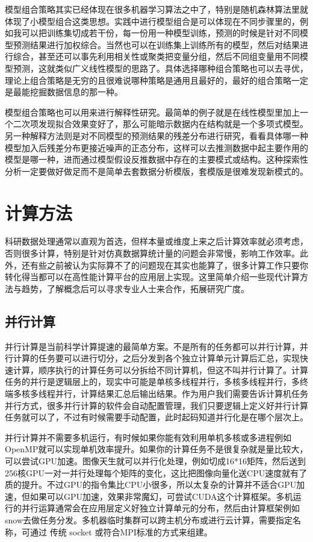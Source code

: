 \documentclass[]{tufte-book}
\begin{document}
模型组合策略其实已经体现在很多机器学习算法之中了，特别是随机森林算法里就体现了小模型组合这类思想。实践中进行模型组合是可以体现在不同步骤里的，例如我可以把训练集切成若干份，每一份用一种模型训练，预测的时候是针对不同模型预测结果进行加权综合。当然也可以在训练集上训练所有的模型，然后对结果进行综合，甚至还可以事先利用相关性或聚类把变量分组，然后不同组变量用不同模型预测，这就类似广义线性模型的思路了。具体选择哪种组合策略也可以去寻优，理论上组合策略是无穷的且很难说哪种策略是通用且最好的，最好的组合策略一定是最能挖掘数据信息的那一种。

模型组合策略也可以用来进行解释性研究。最简单的例子就是在线性模型里加上一个二次项发现拟合效果变好了，那么可能暗示数据内在结构就是一个多项式模型。另一种解释方法则是对不同模型的预测结果的残差分布进行研究，看看具体哪一种模型加入后残差分布更接近噪声的正态分布，这样可以去推测数据中起主要作用的模型是哪一种，进而通过模型假设反推数据中存在的主要模式或结构。这种探索性分析一定要做好做足而不是简单去套数据分析模版，套模版是很难发现新模式的。

\hypertarget{ux8ba1ux7b97ux65b9ux6cd5}{%
\section{计算方法}\label{ux8ba1ux7b97ux65b9ux6cd5}}

科研数据处理通常以直观为首选，但样本量或维度上来之后计算效率就必须考虑，否则很多计算，特别是针对仿真数据算统计量的问题会非常慢，影响工作效率。此外，还有些之前被认为实际算不了的问题现在其实也能算了，很多计算工作只要你转化得当都可以在高性能计算平台的应用层上实现。这里简单介绍一些现代计算方法与趋势，了解概念后可以寻求专业人士来合作，拓展研究广度。

\hypertarget{ux5e76ux884cux8ba1ux7b97}{%
\subsection{并行计算}\label{ux5e76ux884cux8ba1ux7b97}}

并行计算是当前科学计算提速的最简单方案。不是所有的任务都可以并行计算，并行计算的任务要可以进行切分，之后分发到各个独立计算单元计算后汇总，实现快速计算，顺序执行的计算任务可以分拆给不同计算机，但这不叫并行计算了。计算任务的并行是逻辑层上的，现实中可能是单核多线程并行，多核多线程并行，多终端多核多线程并行，计算结果汇总后输出结果。作为用户我们需要告诉计算机任务并行方式，很多并行计算的软件会自动配置管理，我们只要逻辑上定义好并行计算任务就可以了，不过有时候需要手动配置，此时起码知道并行化是在哪个层次上。

并行计算并不需要多机运行，有时候如果你能有效利用单机多核或多进程例如OpenMP就可以实现单机效率提升。如果你的计算任务不是很复杂就是量比较大，可以尝试GPU加速。图像天生就可以并行化处理，例如切成16*16矩阵，然后送到256核GPU一对一并行处理每个矩阵的变化，这比把图像向量化送CPU速度就有了质的提升。不过GPU的指令集比CPU小很多，所以太复杂的计算并不适合GPU加速，但如果可以GPU加速，效果非常魔幻，可尝试CUDA这个计算框架。多机运行的并行运算通常会在应用层定义好独立计算单元的分布，然后由计算框架例如snow去做任务分发。多机器临时集群可以跨主机分布或进行云计算，需要指定名称，可通过 传统 socket 或符合MPI标准的方式来组建。
\end{document}
